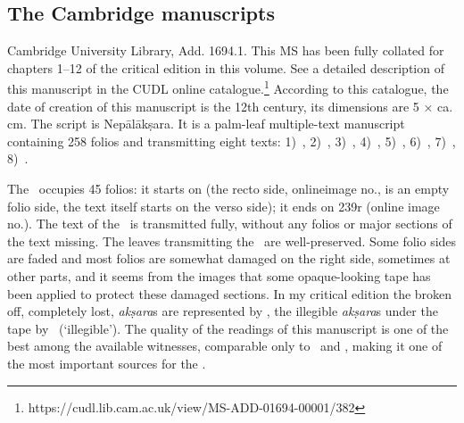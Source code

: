 

\medskip
\subsection{The Cambridge manuscripts}

\noindent
{}
Cambridge University Library, Add. 1694.1. This MS has been 
fully collated for chapters 1--12 of the critical edition in this volume. 
See a detailed description of this manuscript in the 
CUDL online catalogue.\footnote{https://cudl.lib.cam.ac.uk/view/MS-ADD-01694-00001/382}
According to this catalogue, the date of creation of this manuscript 
is the 12th century, its dimensions are 5 × ca. cm. 
The script is Nepālākṣara. It is a palm-leaf multiple-text manuscript containing 258
folios and transmitting eight texts: 
1)~,
2)~, 
3)~, 
4)~, 
5)~\Uums, 
6)~,
7)~,
8)~.

The \VSS\ occupies 45 folios: it starts on  
(the recto side, onlineimage no., is an empty folio side,
the text itself starts on the verso side); 
it ends on \fol239r (online image no.). 
The text of the \VSS\ is transmitted fully,
without any folios or major sections of the text missing. The leaves
transmitting the \VSS\ are well-preserved. Some folio sides are faded and
most folios are somewhat damaged on the right side, sometimes at other parts, and it seems from the images that some opaque-looking tape has been applied to protect these damaged sections. 
In my critical edition
the broken off, completely lost, \emph{akṣara}s are represented by \lost,
the illegible \emph{akṣara}s under the tape by \il\ (`illegible'). The
quality of the readings of this manuscript is one of the best among
the available witnesses, comparable only to \msNa\ and \msP, 
making it one of the most important sources for the \VSS.



